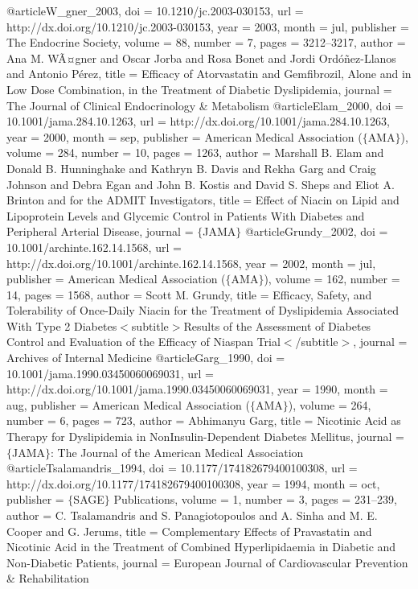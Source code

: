 @article{W_gner_2003,
	doi = {10.1210/jc.2003-030153},
	url = {http://dx.doi.org/10.1210/jc.2003-030153},
	year = 2003,
	month = {jul},
	publisher = {The Endocrine Society},
	volume = {88},
	number = {7},
	pages = {3212--3217},
	author = {Ana M. WÃ¤gner and Oscar Jorba and Rosa Bonet and Jordi Ord{\'{o}}{\~{n}}ez-Llanos and Antonio P{\'{e}}rez},
	title = {Efficacy of Atorvastatin and Gemfibrozil, Alone and in Low Dose Combination, in the Treatment of Diabetic Dyslipidemia},
	journal = {The Journal of Clinical Endocrinology {\&} Metabolism}
}
@article{Elam_2000,
	doi = {10.1001/jama.284.10.1263},
	url = {http://dx.doi.org/10.1001/jama.284.10.1263},
	year = 2000,
	month = {sep},
	publisher = {American Medical Association ($\lbrace$AMA$\rbrace$)},
	volume = {284},
	number = {10},
	pages = {1263},
	author = {Marshall B. Elam and Donald B. Hunninghake and Kathryn B. Davis and Rekha Garg and Craig Johnson and Debra Egan and John B. Kostis and David S. Sheps and Eliot A. Brinton and  for the ADMIT Investigators},
	title = {Effect of Niacin on Lipid and Lipoprotein Levels and Glycemic Control in Patients With Diabetes and Peripheral Arterial Disease},
	journal = {$\lbrace$JAMA$\rbrace$}
}
@article{Grundy_2002,
	doi = {10.1001/archinte.162.14.1568},
	url = {http://dx.doi.org/10.1001/archinte.162.14.1568},
	year = 2002,
	month = {jul},
	publisher = {American Medical Association ($\lbrace$AMA$\rbrace$)},
	volume = {162},
	number = {14},
	pages = {1568},
	author = {Scott M. Grundy},
	title = {Efficacy, Safety, and Tolerability of Once-Daily Niacin for the Treatment of Dyslipidemia Associated With Type 2 Diabetes$\less$subtitle$\greater$Results of the Assessment of Diabetes Control and Evaluation of the Efficacy of Niaspan Trial$\less$/subtitle$\greater$},
	journal = {Archives of Internal Medicine}
}
@article{Garg_1990,
	doi = {10.1001/jama.1990.03450060069031},
	url = {http://dx.doi.org/10.1001/jama.1990.03450060069031},
	year = 1990,
	month = {aug},
	publisher = {American Medical Association ($\lbrace$AMA$\rbrace$)},
	volume = {264},
	number = {6},
	pages = {723},
	author = {Abhimanyu Garg},
	title = {Nicotinic Acid as Therapy for Dyslipidemia in Non{\textemdash}Insulin-Dependent Diabetes Mellitus},
	journal = {$\lbrace$JAMA$\rbrace$: The Journal of the American Medical Association}
}
@article{Tsalamandris_1994,
	doi = {10.1177/174182679400100308},
	url = {http://dx.doi.org/10.1177/174182679400100308},
	year = 1994,
	month = {oct},
	publisher = {$\lbrace$SAGE$\rbrace$ Publications},
	volume = {1},
	number = {3},
	pages = {231--239},
	author = {C. Tsalamandris and S. Panagiotopoulos and A. Sinha and M. E. Cooper and G. Jerums},
	title = {Complementary Effects of Pravastatin and Nicotinic Acid in the Treatment of Combined Hyperlipidaemia in Diabetic and Non-Diabetic Patients},
	journal = {European Journal of Cardiovascular Prevention {\&} Rehabilitation}
}
